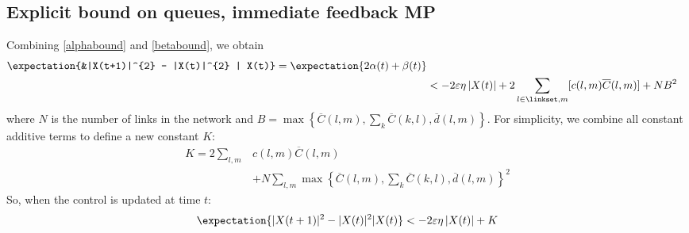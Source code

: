 \subsection*{Explicit bound on queues, immediate feedback MP}
{\color{red} Combining \eqref{alphabound} and \eqref{betabound}, we obtain}
\begin{align}
\expectation{&|X(t+1)|^{2} - |X(t)|^{2}  |   X(t)} = \expectation{2\alpha(t) + \beta(t)} \nonumber \\
&<  -2\varepsilon \eta \left| X(t ) \right| + 2 \sum_{l \in \linkset,m} [c(l,m)\overline{C} (l,m) ]+ NB^{2}
\end{align}
where $N$ is the number of links in the network and $B=\max\left\{ \overline{C}(l,m), \sum_{k} \overline{C}(k,l),  \overline d (l,m) \right\}$. 
For simplicity, we combine all constant additive terms to define a new constant $K$:
\begin{align}\label{constCalc}
K = 2 \displaystyle\sum_{l,m} & c(l,m) \overline{C}(l,m) \\
\nonumber & + N \displaystyle\sum_{l,m} \max\left\{ \overline{C}(l,m), \sum_{k} \overline{C}(k,l),  \overline d (l,m) \right\}^2
\end{align}
So, when the control is updated at time $t$:
\begin{equation}\label{stabBasic}
\expectation{|X(t+1)|^{2} - |X(t)|^{2}  |   X(t)} < -2\varepsilon \eta \left| X(t ) \right| + K
\end{equation}









